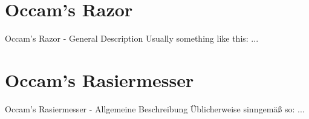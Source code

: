 \ifEnglish

\section{Occam's Razor}

\begin{frame}[c]{Occam's Razor - General Description}
    Usually something like this: ...
\end{frame}



\else

\section{Occam's Rasiermesser}

\begin{frame}[c]{Occam's Rasiermesser - Allgemeine Beschreibung}
    Üblicherweise sinngemäß so: ...
\end{frame}


\fi
